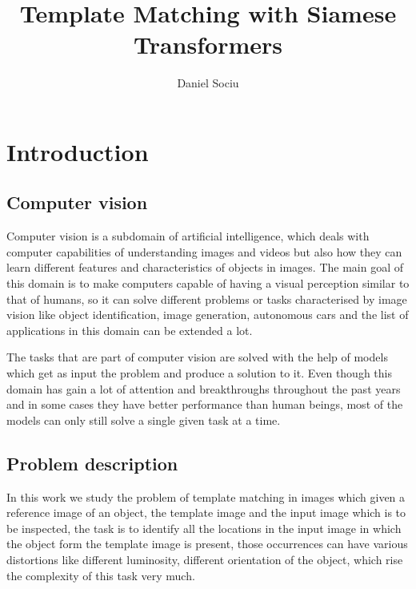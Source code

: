\documentclass{report}[12pt, a4paper]
\title{Template Matching with Siamese Transformers}
\author{Daniel Sociu}
\begin{document}
\cleardoublepage
\pagestyle{front}
\let\ps@plain\ps@front



\restoregeometry

\addtocounter{page}{1}



\tableofcontents

\cleardoublepage
\pagestyle{main}
\let\ps@plain\ps@main

\chapter{Introduction}

\section{Computer vision}

Computer vision is a subdomain of artificial intelligence, which deals with computer capabilities of understanding images and videos but also how they can learn different features and characteristics of objects in images. The main goal of this domain is to make computers capable of having a visual perception similar to that of humans, so it can solve different problems or tasks characterised by image vision like object identification, image generation, autonomous cars and the list of applications in this domain can be extended a lot.

The tasks that are part of computer vision are solved with the help of models which get as input the problem and produce a solution to it. Even though this domain has gain a lot of attention and breakthroughs throughout the past years and in some cases they have better performance than human beings, most of the models can only still solve a single given task at a time. 

\section{Problem description}

In this work we study the problem of template matching in images which given a reference image of an object, the template image and the input image which is to be inspected, the task is to identify all the locations in the input image in which the object form the template image is present, those occurrences can have various distortions like different luminosity, different orientation of the object, which rise the complexity of this task very much.
\end{document}
